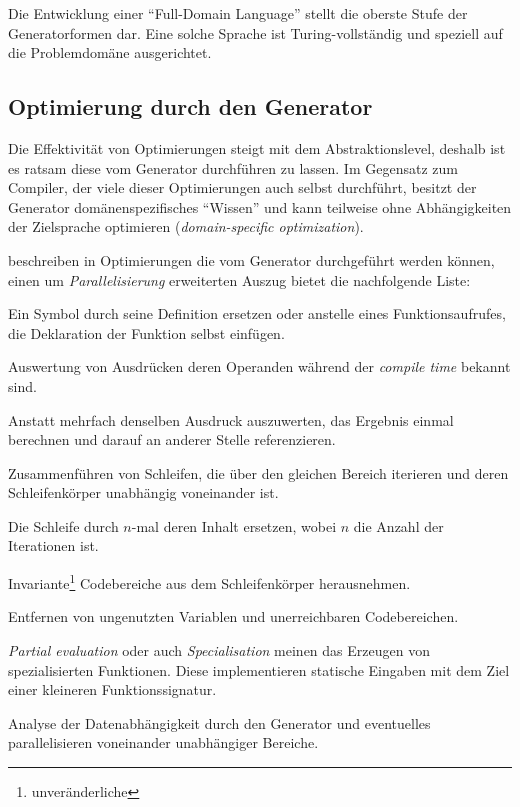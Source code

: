 Die Entwicklung einer \enquote{Full-Domain Language} stellt die oberste Stufe der Generatorformen dar. Eine solche Sprache ist Turing-vollständig und speziell auf die Problemdomäne ausgerichtet.

\subsection{Optimierung durch den Generator}

Die Effektivität von Optimierungen steigt mit dem Abstraktionslevel, deshalb ist es ratsam diese vom Generator durchführen zu lassen. Im Gegensatz zum Compiler, der viele dieser Optimierungen auch selbst durchführt, besitzt der Generator domänenspezifisches \enquote{Wissen} und kann teilweise ohne Abhängigkeiten der Zielsprache optimieren (\emph{domain-specific optimization}).

\citeauthor{czarnecki2000generative} beschreiben in \cite{czarnecki2000generative} Optimierungen die vom Generator durchgeführt werden können, einen um \emph{Parallelisierung} erweiterten Auszug bietet die nachfolgende Liste:

\begin{description}[style=nextline]
\item[Inlining]
    Ein Symbol durch seine Definition ersetzen oder anstelle eines Funktionsaufrufes, die Deklaration der Funktion selbst einfügen.
\item[Constant folding]
    Auswertung von Ausdrücken deren Operanden während der \emph{compile time} bekannt sind.
\item[Data caching]
    Anstatt mehrfach denselben Ausdruck auszuwerten, das Ergebnis einmal berechnen und darauf an anderer Stelle referenzieren.
\item[Loop fusion]
    Zusammenführen von Schleifen, die über den gleichen Bereich iterieren und deren Schleifenkörper unabhängig voneinander ist.
\item[Loop unrolling]
    Die Schleife durch $n$-mal deren Inhalt ersetzen, wobei $n$ die Anzahl der Iterationen ist.
\item[Code motion]
    Invariante\footnote{unveränderliche} Codebereiche aus dem Schleifenkörper herausnehmen.
\item[Dead-code elimination]
    Entfernen von ungenutzten Variablen und unerreichbaren Codebereichen.
\item[Partial evaluation/Specialisation]
    \emph{Partial evaluation} oder auch \emph{Specialisation} meinen das Erzeugen von spezialisierten Funktionen. Diese implementieren statische Eingaben mit dem Ziel einer kleineren Funktionssignatur.
\item[Parallelization]
    Analyse der Datenabhängigkeit durch den Generator und eventuelles parallelisieren voneinander unabhängiger Bereiche.
\end{description}
